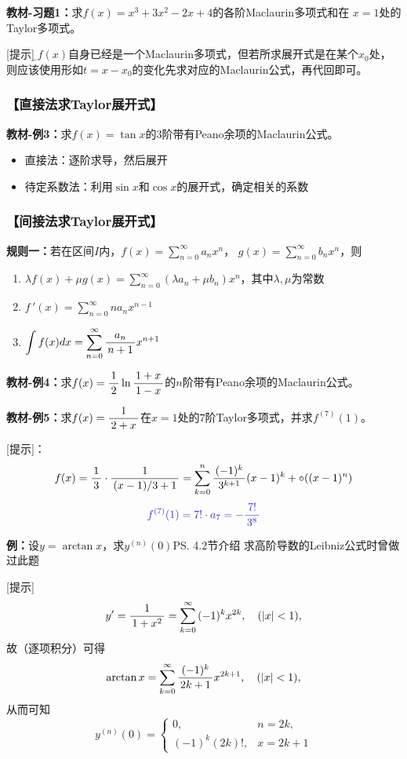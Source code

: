 {\bf 教材-习题1：}求$f(x)=x^3+3x^2-2x+4$的各阶Maclaurin多项式和在
$x=1$处的Taylor多项式。

[提示]：{\b$f(x)$自身已经是一个Maclaurin多项式，但若所求展开式是在某个$x_0$处，
则应该使用形如$t=x-x_0$的变化先求对应的Maclaurin公式，再代回即可。}

\subsubsection{【直接法求Taylor展开式】}

{\bf 教材-例3：}求$f(x)=\tan x$的$3$阶带有Peano余项的Maclaurin公式。

\begin{itemize}
  \setlength{\itemindent}{1cm}
  \item 直接法：逐阶求导，然后展开
  \item 待定系数法：利用$\sin x$和$\cos x$的展开式，确定相关的系数
\end{itemize}

\subsubsection{【间接法求Taylor展开式】}

{\bf 规则一：}若在区间$I$内，$f(x)=\sum\limits_{n=0}^{\infty}a_nx^n$，
$g(x)=\sum\limits_{n=0}^{\infty}b_nx^n$，则
\begin{enumerate}[(1)]
  \setlength{\itemindent}{1cm}
  \item $\lambda f(x)+\mu g(x)=\sum\limits_{n=0}^{\infty}(\lambda a_n+\mu
  b_n)x^n$，其中$\lambda,\mu$为常数 
  \item $f\,'(x)=\sum\limits_{n=0}^{\infty}na_{n}x^{n-1}$ 
  \item $\displaystyle\int f(x)dx=\sum\limits_{n=0}^{\infty}
  \displaystyle\frac{\,{a_{n}}\,}{\,{n+1}\,}x^{n+1}$
\end{enumerate}

{\bf 教材-例4：}求$f(x)=\displaystyle\frac{\,{1}\,}{\,{2}\,}\ln\displaystyle\frac{\,{1+x}\,}{\,{1-x}\,}$的$n$阶带有Peano余项的Maclaurin公式。

{\b{\bf 教材-例5：}求$f(x)=\displaystyle\frac{\,{1}\,}{\,{2+x}\,}$在$x=1$处的$7$阶Taylor多项式，并求$f^{(7)}(1)$。

[提示]：
$$f(x)=\displaystyle\frac{\,{1}\,}{\,{3}\,}\cdot\displaystyle\frac{\,{1}\,}{\,{(x-1)/3+1}\,}=\sum\limits_{k=0}^n
\displaystyle\frac{\,{(-1)^{k}}\,}{\,{3^{k+1}}\,}(x-1)^{k}+\circ((x-1)^n)$$
$${\b f^{(7)}(1)=7!\cdot a_7=-\df{7!}{3^8}}$$
}

{\bf 例：}设$y=\arctan x$，求$y^{(n)}(0)$\ps{4.2节介绍
求高阶导数的Leibniz公式时曾做过此题}

[提示]
$$y'=\displaystyle\frac{\,{1}\,}{\,{1+x^2}\,}=\sum\limits_{k=0}^{\infty}{(-1)^k}x^{2k},\quad (|x|<1),$$
故（逐项积分）可得
$$\arctan x=\sum\limits_{k=0}^{\infty}\displaystyle\frac{\,{(-1)^k}\,}{\,{2k+1}\,}x^{2k+1},
\quad (|x|<1),$$
从而可知
$$y^{(n)}(0)=\left\{\begin{array}{ll}
0,& n=2k,\\ {(-1)^k}(2k)!,& x=2k+1
\end{array}\right.$$

